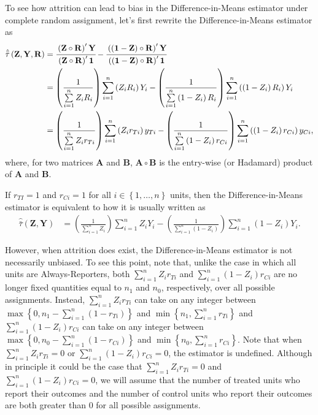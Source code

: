 \documentclass[
  12pt,
  leqno]{article}
\DeclareMathOperator{\1}{\mathbbm{1}}
\begin{document}
To see how attrition can lead to bias in the Difference-in-Means
estimator under complete random assignment, let's first rewrite the
Difference-in-Means estimator as \begin{align*}
\hat{\bar{\tau}}\left(\mathbf{Z}, \mathbf{Y}, \mathbf{R}\right) & = \cfrac{\left(\mathbf{Z} \circ \mathbf{R}\right)'\mathbf{Y}}{\left(\mathbf{Z} \circ \mathbf{R}\right)'\mathbf{1}} - \cfrac{\left(\left(\mathbf{1} - \mathbf{Z}\right) \circ \mathbf{R}\right)'\mathbf{Y}}{\left(\left(\mathbf{1} - \mathbf{Z}\right) \circ \mathbf{R}\right)'\mathbf{1}} \\
& = \left(\frac{1}{\sum \limits_{i = 1}^n Z_i R_i}\right) \sum \limits_{i = 1}^n \left(Z_i R_i\right) Y_i - \left(\frac{1}{\sum \limits_{i = 1}^n \left(1 - Z_i\right)R_i}\right) \sum \limits_{i = 1}^n \left(\left(1 - Z_i\right) R_i\right) Y_i \\
& = \left(\frac{1}{\sum \limits_{i = 1}^n Z_i r_{Ti}}\right) \sum \limits_{i = 1}^n \left(Z_i r_{Ti}\right) y_{Ti} - \left(\frac{1}{\sum \limits_{i = 1}^n \left(1 - Z_i\right)r_{Ci}}\right) \sum \limits_{i = 1}^n \left(\left(1 - Z_i\right) r_{Ci}\right) y_{Ci},
\end{align*} where, for two matrices \(\mathbf{A}\) and \(\mathbf{B}\),
\(\mathbf{A} \circ \mathbf{B}\) is the entry-wise (or Hadamard) product
of \(\mathbf{A}\) and \(\mathbf{B}\).

If \(r_{TI} = 1\) and \(r_{Ci} = 1\) for all
\(i \in \left\{1, \dots , n\right\}\) units, then the
Difference-in-Means estimator is equivalent to how it is usually written
as \begin{align*}
\hat{\bar{\tau}}\left(\mathbf{Z}, \mathbf{Y}\right) & = \left(\frac{1}{\sum \limits_{i = 1}^n Z_i}\right) \sum \limits_{i = 1}^n Z_i Y_i - \left(\frac{1}{\sum \limits_{i = 1}^n \left(1 - Z_i\right)}\right) \sum \limits_{i = 1}^n \left(1 - Z_i\right) Y_i.
\end{align*}

However, when attrition does exist, the Difference-in-Means estimator is
not necessarily unbiased. To see this point, note that, unlike the case
in which all units are Always-Reporters, both
\(\sum \limits_{i = 1}^n Z_i r_{Ti}\) and
\(\sum \limits_{i = 1}^n \left(1 - Z_i\right)r_{Ci}\) are no longer
fixed quantities equal to \(n_1\) and \(n_0\), respectively, over all
possible assignments. Instead, \(\sum \limits_{i = 1}^n Z_i r_{Ti}\) can
take on any integer between
\(\max\left\{0, n_1 - \sum \limits_{i = 1}^n \left(1 - r_{Ti}\right)\right\}\)
and \(\min\left\{n_1, \sum \limits_{i = 1}^n r_{Ti}\right\}\) and
\(\sum \limits_{i = 1}^n \left(1 - Z_i\right) r_{Ci}\) can take on any
integer between
\(\max\left\{0, n_0 - \sum \limits_{i = 1}^n \left(1 - r_{Ci}\right)\right\}\)
and \(\min\left\{n_0, \sum \limits_{i = 1}^n r_{Ci}\right\}\). Note that
when \(\sum \limits_{i = 1}^n Z_i r_{Ti} = 0\) or
\(\sum \limits_{i = 1}^n \left(1 - Z_i\right) r_{Ci} = 0\), the
estimator is undefined. Although in principle it could be the case that
\(\sum \limits_{i = 1}^n Z_i r_{Ti} = 0\) and
\(\sum \limits_{i = 1}^n \left(1 - Z_i\right) r_{Ci} = 0\), we will
assume that the number of treated units who report their outcomes and
the number of control units who report their outcomes are both greater
than \(0\) for all possible assignments.
\end{document}
